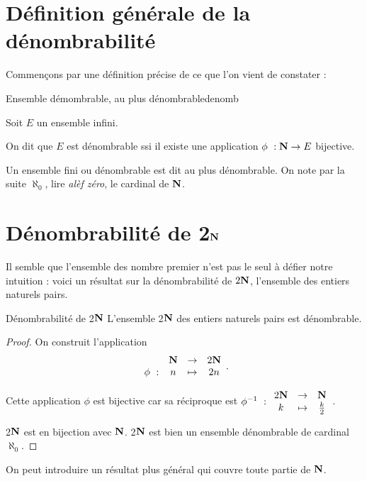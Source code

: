 \documentclass[a4paper,french,final]{memoir}
\begin{document}
\section{Définition générale de la dénombrabilité}
Commençons par une définition précise de ce que l'on vient de constater :
\begin{defb}{Ensemble démombrable, au plus dénombrable}{denomb}

	 Soit $E$ un ensemble infini. 
	 
	 On dit que $E$ est dénombrable ssi il existe une application $\phi~: \NN \to E $ bijective. 
	 
	 Un ensemble fini ou dénombrable est dit au plus dénombrable. \newline
	 On note par la suite $\aleph_0$, lire \emph{alèf zéro}\footnotemark, le cardinal de $\mathbf{N}$. 
\end{defb}


\section{\texorpdfstring{Dénombrabilité de 2$\mathbf{N}$}{Dénombrabilité de 2N}}
\label{sec:denombrabilite_usuelle}
Il semble que l'ensemble des nombre premier n'est pas le seul à défier notre intuition :  voici un résultat sur la dénombrabilité de  $2\mathbf{N}$, l'ensemble des entiers naturels pairs.

\begin{theoremb}{Dénombrabilité de 2$\mathbf{N}$}{}
	L'ensemble 2$\mathbf{N}$ des entiers naturels pairs est dénombrable. 
\end{theoremb}

\begin{proof}
	On construit l'application \[ \begin{array}{cccc}
	\ & \NN& \to& 2\NN \\
	\phi~: & n & \mapsto & 2n
	\end{array}.\]
	
	Cette application $\phi $ est bijective car sa réciproque est $ \phi^{-1}~: \begin{array}{ccc}
	2\NN & \to & \NN\\
	k & \mapsto & \frac{k}{2}
	\end{array}$. 
	
	2$\mathbf{N}$ est en bijection avec $\mathbf{N}$. 2$\mathbf{N}$ est bien un ensemble dénombrable de cardinal $\aleph_0$. 
\end{proof}

On peut introduire un résultat plus général qui couvre toute partie de $\mathbf{N}$. 
\end{document}
